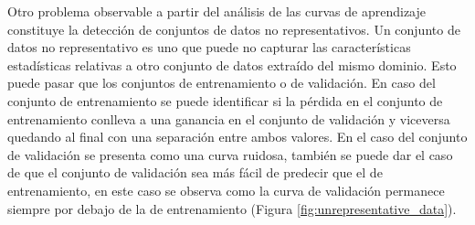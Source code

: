 Otro problema observable a partir del análisis de las curvas de aprendizaje constituye la detección de conjuntos
de datos no representativos. Un conjunto de datos no representativo es uno que puede no 
capturar las características estadísticas relativas a otro conjunto de datos extraído del mismo dominio.
Esto puede pasar que los conjuntos de entrenamiento o de validación. En caso del conjunto de entrenamiento
se puede identificar si la pérdida en el conjunto de entrenamiento conlleva a una ganancia en el conjunto de 
validación y viceversa quedando al final con una separación entre ambos valores. En el caso del conjunto de 
validación se presenta como una curva ruidosa, también se puede dar el caso de que el conjunto  de validación
sea más fácil de predecir que el de entrenamiento, en este caso se observa como la curva de validación permanece
siempre por debajo de la de entrenamiento (Figura \ref{fig:unrepresentative_data}).

